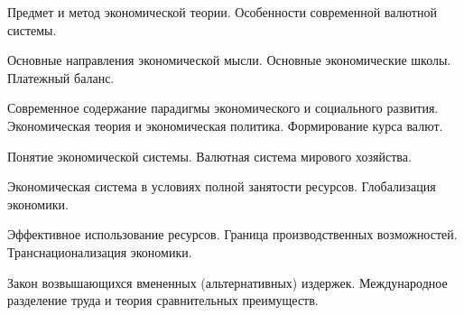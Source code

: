 \documentclass[
	14pt,
	a4paper,
	]
	{scrartcl}
\begin{document}
\shapk
{}
\setcounter{zad}{0}

\vfill
\z 	Предмет и метод экономической теории.
 \vfill
\z 	Особенности современной валютной системы. \vfill

\vfill

\newpage


\shapk
{}
\setcounter{zad}{0}

\vfill
\z 	Основные направления экономической мысли. Основные экономические школы.
 \vfill
\z 	Платежный баланс.
 \vfill

\vfill

\newpage


\shapk
{}
\setcounter{zad}{0}

\vfill
\z 	Современное содержание парадигмы экономического и социального развития. Экономическая теория и экономическая политика.
 \vfill
\z 	Формирование курса валют.
 \vfill

\vfill

\newpage


\shapk
{}
\setcounter{zad}{0}

\vfill
\z 	Понятие экономической системы.  
 \vfill
\z 	Валютная система мирового хозяйства.
 \vfill

\vfill

\newpage


\shapk
{}
\setcounter{zad}{0}

\vfill
\z 	Экономическая система в условиях полной занятости ресурсов.
 \vfill
\z 	Глобализация экономики.
 \vfill

\vfill

\newpage


\shapk
{}
\setcounter{zad}{0}

\vfill
\z 	Эффективное использование ресурсов.  Граница производственных возможностей.
 \vfill
\z 	Транснационализация экономики.
 \vfill

\vfill

\newpage


\shapk
{}
\setcounter{zad}{0}

\vfill
\z 	Закон возвышающихся вмененных (альтернативных) издержек.
 \vfill
\z 	Международное разделение труда и теория сравнительных преимуществ.
 \vfill

\vfill

\newpage


\shapk
{}
\setcounter{zad}{0}
\end{document}
